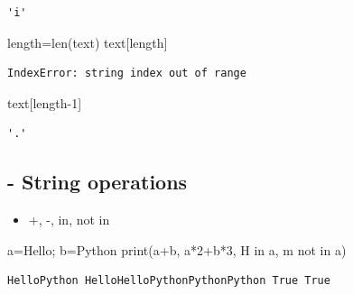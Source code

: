 \documentclass[
  a4paper,
  DIV=11,
  numbers=noendperiod]{scrreprt}
\newenvironment{Shaded}{\begin{snugshade}}{\end{snugshade}}
\newcommand{\BuiltInTok}[1]{\textcolor[rgb]{0.00,0.23,0.31}{#1}}
\newcommand{\DecValTok}[1]{\textcolor[rgb]{0.68,0.00,0.00}{#1}}
\newcommand{\KeywordTok}[1]{\textcolor[rgb]{0.00,0.23,0.31}{#1}}
\newcommand{\NormalTok}[1]{\textcolor[rgb]{0.00,0.23,0.31}{#1}}
\newcommand{\OperatorTok}[1]{\textcolor[rgb]{0.37,0.37,0.37}{#1}}
\newcommand{\StringTok}[1]{\textcolor[rgb]{0.13,0.47,0.30}{#1}}
\providecommand{\tightlist}{%
  \setlength{\itemsep}{0pt}\setlength{\parskip}{0pt}}\usepackage{longtable,booktabs,array}
\begin{document}
\begin{verbatim}
'i'
\end{verbatim}

\begin{Shaded}
\begin{Highlighting}[]
\NormalTok{length}\OperatorTok{=}\BuiltInTok{len}\NormalTok{(text)}
\NormalTok{text[length]}
\end{Highlighting}
\end{Shaded}

\begin{verbatim}
IndexError: string index out of range
\end{verbatim}

\begin{Shaded}
\begin{Highlighting}[]
\NormalTok{text[length}\OperatorTok{{-}}\DecValTok{1}\NormalTok{]}
\end{Highlighting}
\end{Shaded}

\begin{verbatim}
'.'
\end{verbatim}

\subsection{- String operations}\label{string-operations}

\begin{itemize}
\tightlist
\item
  +, -, in, not in
\end{itemize}

\begin{Shaded}
\begin{Highlighting}[]
\NormalTok{a}\OperatorTok{=}\StringTok{\textquotesingle{}Hello\textquotesingle{}}\OperatorTok{;}\NormalTok{ b}\OperatorTok{=}\StringTok{\textquotesingle{}Python\textquotesingle{}}
\BuiltInTok{print}\NormalTok{(a}\OperatorTok{+}\NormalTok{b, a}\OperatorTok{*}\DecValTok{2}\OperatorTok{+}\NormalTok{b}\OperatorTok{*}\DecValTok{3}\NormalTok{, }\StringTok{\textquotesingle{}H\textquotesingle{}} \KeywordTok{in}\NormalTok{ a, }\StringTok{\textquotesingle{}m\textquotesingle{}} \KeywordTok{not} \KeywordTok{in}\NormalTok{ a)}
\end{Highlighting}
\end{Shaded}

\begin{verbatim}
HelloPython HelloHelloPythonPythonPython True True
\end{verbatim}
\end{document}
